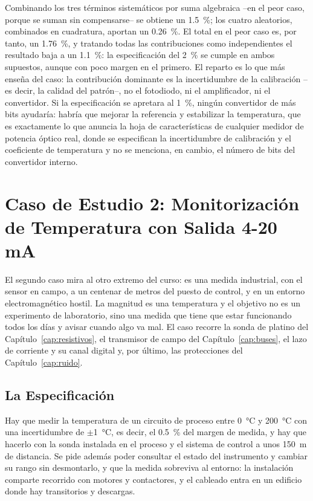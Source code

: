 Combinando los tres términos sistemáticos por suma algebraica --en el peor caso, porque se suman sin compensarse-- se obtiene un \SI{1.5}{\percent}; los cuatro aleatorios, combinados en cuadratura, aportan un \SI{0.26}{\percent}. El total en el peor caso es, por tanto, un \SI{1.76}{\percent}, y tratando todas las contribuciones como independientes el resultado baja a un \SI{1.1}{\percent}: la especificación del \SI{2}{\percent} se cumple en ambos supuestos, aunque con poco margen en el primero. El reparto es lo que más enseña del caso: la contribución dominante es la incertidumbre de la calibración --es decir, la calidad del patrón--, no el fotodiodo, ni el amplificador, ni el convertidor. Si la especificación se apretara al \SI{1}{\percent}, ningún convertidor de más bits ayudaría: habría que mejorar la referencia y estabilizar la temperatura, que es exactamente lo que anuncia la hoja de características de cualquier medidor de potencia óptico real, donde se especifican la incertidumbre de calibración y el coeficiente de temperatura y no se menciona, en cambio, el número de bits del convertidor interno.

\section{Caso de Estudio 2: Monitorización de Temperatura con Salida 4-20 mA}\label{sec:caso_temperatura}

El segundo caso mira al otro extremo del curso: es una medida industrial, con el sensor en campo, a un centenar de metros del puesto de control, y en un entorno electromagnético hostil. La magnitud es una temperatura y el objetivo no es un experimento de laboratorio, sino una medida que tiene que estar funcionando todos los días y avisar cuando algo va mal. El caso recorre la sonda de platino del Capítulo~\ref{cap:resistivos}, el transmisor de campo del Capítulo~\ref{cap:buses}, el lazo de corriente y su canal digital y, por último, las protecciones del Capítulo~\ref{cap:ruido}.

\subsection{La Especificación}\label{sub:temperatura_especificacion}

Hay que medir la temperatura de un circuito de proceso entre \SI{0}{\celsius} y \SI{200}{\celsius} con una incertidumbre de $\pm$\SI{1}{\celsius}, es decir, el \SI{0.5}{\percent} del margen de medida, y hay que hacerlo con la sonda instalada en el proceso y el sistema de control a unos \SI{150}{\meter} de distancia. Se pide además poder consultar el estado del instrumento y cambiar su rango sin desmontarlo, y que la medida sobreviva al entorno: la instalación comparte recorrido con motores y contactores, y el cableado entra en un edificio donde hay transitorios y descargas.

